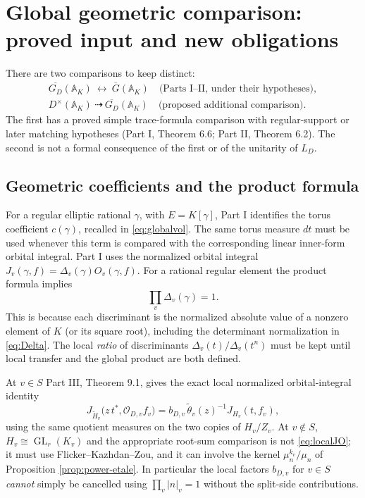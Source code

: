 \documentclass[11pt]{article}
\newcommand{\A}{\mathbb A}
\newcommand{\GL}{\operatorname{GL}}
\newcommand{\tH}{\widetilde H}
\newcommand{\Gb}{\overline G}
\newcommand{\GDb}{\overline{G_D}}
\theoremstyle{plain}
\theoremstyle{definition}
\begin{document}
\section{Global geometric comparison: proved input and new obligations}\label{sec:geometric}
There are two comparisons to keep distinct:
\begin{equation}\label{eq:twocomparisons}
 \begin{gathered}
 \GDb(\A_K)\ \longleftrightarrow\ \Gb(\A_K)
 \quad\text{(Parts I--II, under their hypotheses)},\\[3pt]
 D^\times(\A_K)\ \dashrightarrow\ \GDb(\A_K)
 \quad\text{(proposed additional comparison)}.
 \end{gathered}
\end{equation}
The first has a proved simple trace-formula comparison with
regular-support or later matching hypotheses (Part I, Theorem 6.6;
Part II, Theorem 6.2).
The second is not a formal consequence of the first or of the
unitarity of $L_D$.

\subsection{Geometric coefficients and the product formula}
For a regular elliptic rational $\gamma$, with $E=K[\gamma]$,
Part I identifies the torus coefficient $c(\gamma)$, recalled in
\eqref{eq:globalvol}. The same torus measure $dt$ must be used
whenever this term is compared with the corresponding linear
inner-form orbital integral.
Part I uses the normalized orbital integral
$J_v(\gamma,f)=\Delta_v(\gamma)O_v(\gamma,f)$.
For a rational regular element the product formula implies
\begin{equation}\label{eq:discprod}
 \prod_v\Delta_v(\gamma)=1.
\end{equation}
This is because each discriminant is the normalized absolute
value of a nonzero element of $K$ (or its square root), including
the determinant normalization in \eqref{eq:Delta}.
The local \emph{ratio} of discriminants
$\Delta_v(t)/\Delta_v(t^n)$ must be kept until local transfer
and the global product are both defined.

At $v\in S$ Part III, Theorem 9.1, gives the exact local
normalized orbital-integral identity
\begin{equation}\label{eq:localJO}
 J_{\tH_v}\bigl(z\,t^*,\mathcal O_{D,v}f_v\bigr)
 =b_{D,v}\,\widetilde\theta_v(z)^{-1}
 J_{H_v}(t,f_v),
\end{equation}
using the same quotient measures on the two copies of $H_v/Z_v$.
At $v\notin S$, $H_v\cong\GL_r(K_v)$ and the appropriate
root-sum comparison is not \eqref{eq:localJO}; it must use
Flicker--Kazhdan--Zou, and it can involve the kernel
$\mu_n^{k_v}/\mu_n$ of Proposition \ref{prop:power-etale}.
In particular the local factors $b_{D,v}$ for $v\in S$
\emph{cannot} simply be cancelled using
$\prod_v|n|_v=1$ without the split-side contributions.
\end{document}
